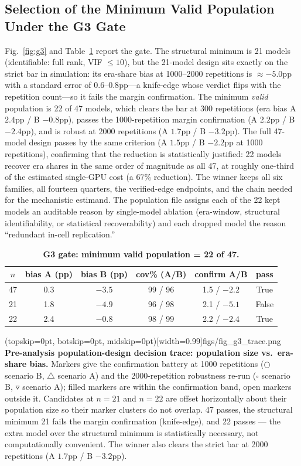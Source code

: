 \documentclass{ieeeaccess}
\theoremstyle{definition}
\theoremstyle{plain}
\begin{document}
\subsection{Selection of the Minimum Valid Population Under the G3 Gate}
\label{sec:results-g3}
Fig.~\ref{fig:g3} and Table~\ref{tab:g3} report the gate. The structural minimum is
21 models (identifiable: full rank, VIF $\le10$), but the 21-model design sits
exactly on the strict bar in simulation: its era-share bias at 1000--2000
repetitions is $\approx-5.0$pp with a standard error of $0.6$--$0.8$pp---a
knife-edge whose verdict flips with the repetition count---so it fails the
margin confirmation. The minimum \emph{valid} population is 22 of 47 models,
which clears the bar at 300 repetitions (era bias A $2.4$pp / B $-0.8$pp), passes
the 1000-repetition margin confirmation (A $2.2$pp / B $-2.4$pp), and is robust at
2000 repetitions (A $1.7$pp / B $-3.2$pp). The full 47-model design passes by the
same criterion (A $1.5$pp / B $-2.2$pp at 1000 repetitions), confirming that the
reduction is statistically justified: 22 models recover era shares in the same
order of magnitude as all 47, at roughly one-third of the estimated single-GPU
cost (a 67\% reduction).
The winner keeps all six families, all fourteen quarters, the verified-edge
endpoints, and the chain needed for the mechanistic estimand. The population file
assigns each of the 22 kept models an auditable reason by single-model ablation
(era-window, structural identifiability, or statistical recoverability)
and each dropped model the reason ``redundant in-cell replication.''

\begin{table}[t]
\caption{\textbf{G3 gate: minimum valid population = 22 of 47.}}
\label{tab:g3}
\setlength{\tabcolsep}{3pt}
\footnotesize
\begin{tabular}{|c|c|c|c|c|c|}
\hline
$n$ & bias A (pp) & bias B (pp) & cov\% (A/B) & confirm A/B & pass \\
\hline
47 & 0.3 & $-3.5$ & 99 / 96 & 1.5 / $-2.2$ & True \\
21 & 1.8 & $-4.9$ & 96 / 98 & 2.1 / $-5.1$ & False \\
22 & 2.4 & $-0.8$ & 98 / 99 & 2.2 / $-2.4$ & True \\
\hline
\end{tabular}
\end{table}

\Figure[t!](topskip=0pt, botskip=0pt, midskip=0pt)[width=0.99\columnwidth]{figs/fig_g3_trace.png}
{ \textbf{Pre-analysis population-design decision trace: population size vs.\
era-share bias.} Markers give the confirmation battery at 1000 repetitions
($\bigcirc$ scenario B, $\triangle$ scenario A) and the 2000-repetition
robustness re-run ($\square$ scenario B, $\triangledown$ scenario A); filled
markers are within the confirmation band, open markers outside it. Candidates
at $n=21$ and $n=22$ are offset horizontally about their population size so
their marker clusters do not overlap. 47 passes, the structural minimum 21
fails the margin confirmation (knife-edge), and 22 passes --- the extra model
over the structural minimum is statistically necessary, not computationally
convenient. The winner also clears the strict bar at 2000 repetitions
(A $1.7$pp / B $-3.2$pp).\label{fig:g3}}
\end{document}
